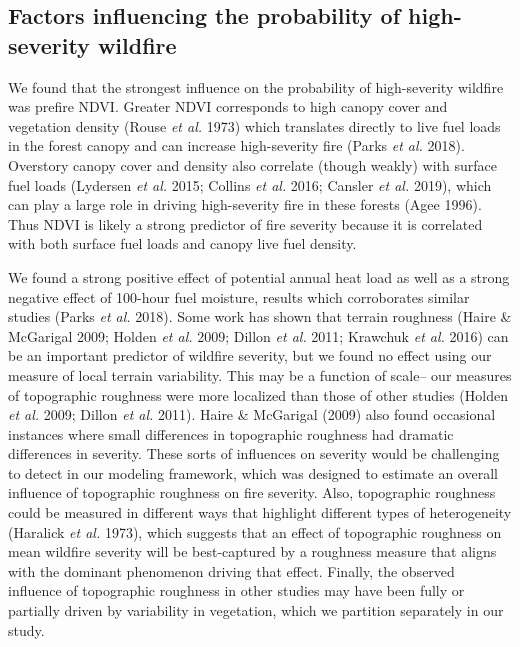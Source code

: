 \documentclass[]{article}
\begin{document}
\hypertarget{factors-influencing-the-probability-of-high-severity-wildfire}{%
\subsection{Factors influencing the probability of high-severity
wildfire}\label{factors-influencing-the-probability-of-high-severity-wildfire}}

We found that the strongest influence on the probability of
high-severity wildfire was prefire NDVI. Greater NDVI corresponds to
high canopy cover and vegetation density (Rouse \emph{et al.} 1973)
which translates directly to live fuel loads in the forest canopy and
can increase high-severity fire (Parks \emph{et al.} 2018). Overstory
canopy cover and density also correlate (though weakly) with surface
fuel loads (Lydersen \emph{et al.} 2015; Collins \emph{et al.} 2016;
Cansler \emph{et al.} 2019), which can play a large role in driving
high-severity fire in these forests (Agee 1996). Thus NDVI is likely a
strong predictor of fire severity because it is correlated with both
surface fuel loads and canopy live fuel density.

We found a strong positive effect of potential annual heat load as well
as a strong negative effect of 100-hour fuel moisture, results which
corroborates similar studies (Parks \emph{et al.} 2018). Some work has
shown that terrain roughness (Haire \& McGarigal 2009; Holden \emph{et
al.} 2009; Dillon \emph{et al.} 2011; Krawchuk \emph{et al.} 2016) can
be an important predictor of wildfire severity, but we found no effect
using our measure of local terrain variability. This may be a function
of scale-- our measures of topographic roughness were more localized
than those of other studies (Holden \emph{et al.} 2009; Dillon \emph{et
al.} 2011). Haire \& McGarigal (2009) also found occasional instances
where small differences in topographic roughness had dramatic
differences in severity. These sorts of influences on severity would be
challenging to detect in our modeling framework, which was designed to
estimate an overall influence of topographic roughness on fire severity.
Also, topographic roughness could be measured in different ways that
highlight different types of heterogeneity (Haralick \emph{et al.}
1973), which suggests that an effect of topographic roughness on mean
wildfire severity will be best-captured by a roughness measure that
aligns with the dominant phenomenon driving that effect. Finally, the
observed influence of topographic roughness in other studies may have
been fully or partially driven by variability in vegetation, which we
partition separately in our study.
\end{document}
